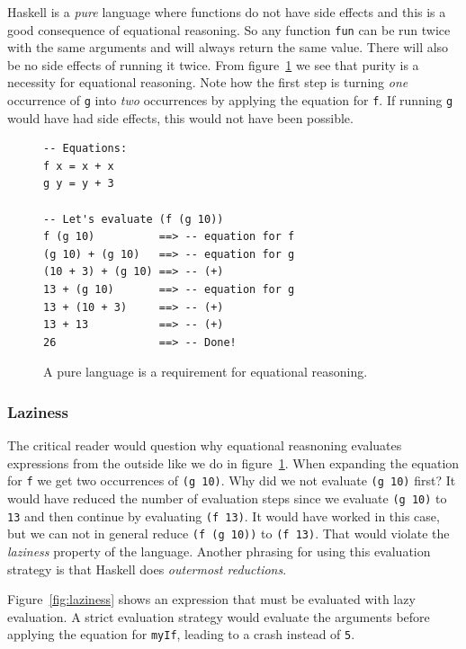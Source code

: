 Haskell is a \emph{pure} language where functions do not have side
effects and this is a good consequence of equational reasoning. So any
function \texttt{fun} can be run twice with the same arguments and will
always return the same value. There will also be no side effects of
running it twice. From figure~\ref{fig:purity_er} we see that purity is
a necessity for equational reasoning. Note how the first step is turning
\emph{one} occurrence of \texttt{g} into \emph{two} occurrences by
applying the equation for \texttt{f}. If running \texttt{g} would have
had side effects, this would not have been possible.

\begin{figure}
\begin{mdframed}
  \begin{verbatim}
-- Equations:
f x = x + x
g y = y + 3

-- Let's evaluate (f (g 10))
f (g 10)          ==> -- equation for f
(g 10) + (g 10)   ==> -- equation for g
(10 + 3) + (g 10) ==> -- (+)
13 + (g 10)       ==> -- equation for g
13 + (10 + 3)     ==> -- (+)
13 + 13           ==> -- (+)
26                ==> -- Done!
  \end{verbatim}
  \caption{A pure language is a requirement for equational reasoning.}
  \label{fig:purity_er}
\end{mdframed}
\end{figure}

\subsubsection{Laziness}

The critical reader would question why equational reasnoning evaluates
expressions from the outside like we do in figure~\ref{fig:purity_er}.
When expanding the equation for \texttt{f} we get two occurrences of
\texttt{(g 10)}. Why did we not evaluate \texttt{(g 10)} first? It
would have reduced the number of evaluation steps since we evaluate
\texttt{(g 10)} to \texttt{13} and then continue by evaluating
\texttt{(f 13)}. It would have worked in this case, but we can not
in general reduce \texttt{(f (g 10))} to \texttt{(f 13)}. That would
violate the \emph{laziness} property of the language. Another phrasing
for using this evaluation strategy is that Haskell does \emph{outermost
reductions}.

Figure~\ref{fig:laziness} shows an expression that must be evaluated
with lazy evaluation. A strict evaluation strategy would evaluate the
arguments before applying the equation for \texttt{myIf}, leading to a
crash instead of \texttt{5}.

